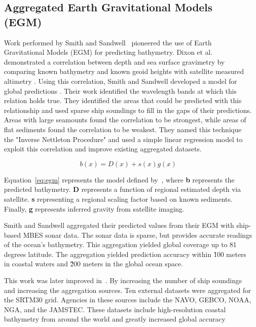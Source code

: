 \subsection{Aggregated Earth Gravitational Models (EGM)}
Work performed by Smith and Sandwell~\cite{smith1994bathymetric,smith1997global} pioneered the use of Earth Gravitational Models (EGM) for predicting bathymetry.
Dixon et al. demonstrated a correlation between depth and sea surface gravimetry by comparing known bathymetry and known geoid heights with satellite measured altimetry \cite{dixon1983bathymetric}.
Using this correlation, Smith and Sandwell developed a model for global predictions \cite{smith1994bathymetric}.
Their work identified the wavelength bands at which this relation holds true.
They identified the areas that could be predicted with this relationship and used sparse ship soundings to fill in the gaps of their predictions.
Areas with large seamounts found the correlation to be strongest, while areas of flat sediments found the correlation to be weakest.
They named this technique the "Inverse Nettleton Procedure" and used a simple linear regression model to exploit this correlation and improve existing aggregated datasets.

\begin{equation}
    b(x) = D(x) + s(x)g(x) \label{eq:egm}
\end{equation}

\par
Equation~\ref{eq:egm} represents the model defined by~\cite{smith1994bathymetric}, where \textbf{b} represents the predicted bathymetry.
\textbf{D} represents a function of regional estimated depth via satellite.
\textbf{s} representing a regional scaling factor based on known sediments.
Finally, \textbf{g} represents inferred gravity from satellite imaging.

\par
Smith and Sandwell aggregated their predicted values from their \ac{EGM} with ship-based \ac{MBES} sonar data.
The sonar data is sparse, but provides accurate readings of the ocean's bathymetry.
This aggregation yielded global coverage up to 81 degrees latitude.
The aggregation yielded prediction accuracy within \~100 meters in coastal waters and \~200 meters in the global ocean space.

\par 
This work was later improved in~\cite{becker2009global}.
By increasing the number of ship soundings and increasing the aggregation sources.
Ten external datasets were aggregated for the SRTM30 grid.
Agencies in these sources include the \ac{NAVO}, \ac{GEBCO}, \ac{NOAA}, \ac{NGA}, and the \ac{JAMSTEC}.
These datasets include high-resolution coastal bathymetry from around the world and greatly increased global accuracy

